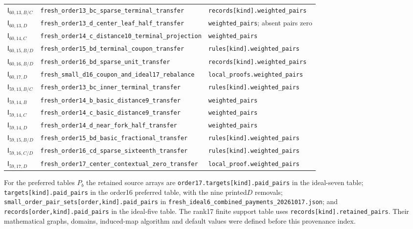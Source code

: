 \documentclass[11pt]{article}
\theoremstyle{remark}\newtheorem{remark}[theorem]{Remark}
\newcommand{\cert}[1]{\nolinkurl{#1}}
\begin{document}
{\begin{longtable}{@{}p{}p{}p{}@{}}
$\mathsf I_{60,13,B/C}$&\cert{fresh_order13_bc_sparse_terminal_transfer}&\cert{records[kind].weighted_pairs}\\
$\mathsf I_{60,13,D}$&\cert{fresh_order13_d_center_leaf_half_transfer}&\cert{weighted_pairs}; absent pairs zero\\
$\mathsf I_{60,14,C}$&\cert{fresh_order14_c_distance10_terminal_projection}&\cert{weighted_pairs}\\
$\mathsf I_{60,15,B/D}$&\cert{fresh_order15_bd_terminal_coupon_transfer}&\cert{rules[kind].weighted_pairs}\\
$\mathsf I_{60,16,B/D}$&\cert{fresh_order16_bd_sparse_unit_transfer}&\cert{records[kind].weighted_pairs}\\
$\mathsf I_{60,17,D}$&\cert{fresh_small_d16_coupon_and_ideal17_rebalance}&\cert{local_proofs.weighted_pairs}\\
$\mathsf I_{59,13,B/C}$&\cert{fresh_order13_bc_inner_terminal_transfer}&\cert{rules[kind].weighted_pairs}\\
$\mathsf I_{59,14,B}$&\cert{fresh_order14_b_basic_distance9_transfer}&\cert{weighted_pairs}\\
$\mathsf I_{59,14,C}$&\cert{fresh_order14_c_basic_distance9_transfer}&\cert{weighted_pairs}\\
$\mathsf I_{59,14,D}$&\cert{fresh_order14_d_near_fork_half_transfer}&\cert{weighted_pairs}\\
$\mathsf I_{59,15,B/D}$&\cert{fresh_order15_bd_basic_fractional_transfer}&\cert{rules[kind].weighted_pairs}\\
$\mathsf I_{59,16,C/D}$&\cert{fresh_order16_cd_sparse_sixteenth_transfer}&\cert{rules[kind].weighted_pairs}\\
$\mathsf I_{59,17,D}$&\cert{fresh_order17_center_contextual_zero_transfer}&\cert{local_proof.weighted_pairs}\\
\bottomrule
\end{longtable}
}
For the preferred tables $P_b$ the retained source arrays are
\cert{order17.targets[kind].paid_pairs} in the ideal-seven table;
\cert{targets[kind].paid_pairs} in the order16 preferred table, with
the nine printed$D$ removals; \cert{small_order_pair_sets[order,kind].paid_pairs}
in \cert{fresh_ideal6_combined_payments_20261017.json}; and
\cert{records[order,kind].paid_pairs}
in the ideal-five table. The rank17 finite support table uses
\cert{records[kind].retained_pairs}. Their mathematical graphs,
domains, induced-map algorithm and default values were defined
before this provenance index.
\end{document}
